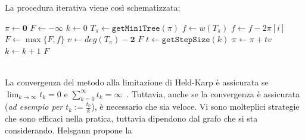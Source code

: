 La procedura iterativa viene così schematizzata:

\begin{algorithm}[H]
\caption{}
\begin{algorithmic}[1]
    \State $\pi \gets \mathbf{0}$
    \State $F \gets -\infty$
    \State $k \gets 0$
    \Repeat
        \State $T_{\pi} \gets \texttt{getMin1Tree}(\pi)$
        \State $f \gets w(T_{\pi})$
            \State $f \gets f - 2\pi[i]$
        \EndFor
        \State $F \gets \max\{F, f\}$
        \State $v \gets deg(T_{\pi}) - \mathbf{2}$
            \State \Return $F$
        \EndIf
        \State $t \gets \texttt{getStepSize}(k)$
        \State $\pi \gets \pi + tv$
        \State $k \gets k+1$
    \State \Return $F$
\EndFunction
\end{algorithmic}
\end{algorithm}
% 
\ \\
La convergenza del metodo alla limitazione di Held-Karp è assicurata se $\displaystyle\lim_{k\to\infty}{t_k}=0$ e 
$\displaystyle\sum_{k=0}^{\infty}{t_k} = \infty$~\cite{subgr}. Tuttavia, anche se la convergenza è assicurata
(\textit{ad esempio per $t_k:=\frac{t_0}{k}$}), è necessario che sia veloce. Vi sono molteplici strategie che 
sono efficaci nella pratica, tuttavia dipendono dal grafo che si sta considerando. Helsgaun propone la 
